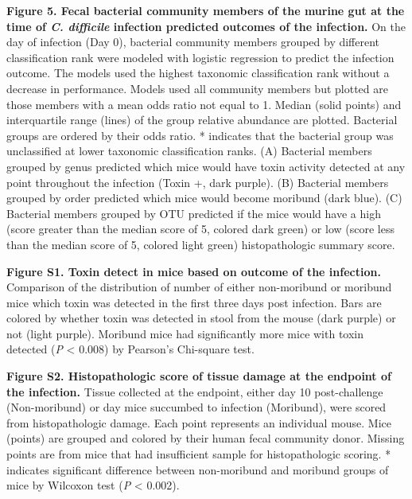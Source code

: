 \documentclass[
  12pt,
]{article}
\begin{document}
\hfill\break

\textbf{Figure 5. Fecal bacterial community members of the murine gut at
the time of \emph{C. difficile} infection predicted outcomes of the
infection.} On the day of infection (Day 0), bacterial community members
grouped by different classification rank were modeled with logistic
regression to predict the infection outcome. The models used the highest
taxonomic classification rank without a decrease in performance. Models
used all community members but plotted are those members with a mean
odds ratio not equal to 1. Median (solid points) and interquartile range
(lines) of the group relative abundance are plotted. Bacterial groups
are ordered by their odds ratio. * indicates that the bacterial group
was unclassified at lower taxonomic classification ranks. (A) Bacterial
members grouped by genus predicted which mice would have toxin activity
detected at any point throughout the infection (Toxin +, dark purple).
(B) Bacterial members grouped by order predicted which mice would become
moribund (dark blue). (C) Bacterial members grouped by OTU predicted if
the mice would have a high (score greater than the median score of 5,
colored dark green) or low (score less than the median score of 5,
colored light green) histopathologic summary score.

\hfill\break

\textbf{Figure S1. Toxin detect in mice based on outcome of the
infection.} Comparison of the distribution of number of either
non-moribund or moribund mice which toxin was detected in the first
three days post infection. Bars are colored by whether toxin was
detected in stool from the mouse (dark purple) or not (light purple).
Moribund mice had significantly more mice with toxin detected (\emph{P}
\textless{} 0.008) by Pearson's Chi-square test.

\hfill\break

\textbf{Figure S2. Histopathologic score of tissue damage at the
endpoint of the infection.} Tissue collected at the endpoint, either day
10 post-challenge (Non-moribund) or day mice succumbed to infection
(Moribund), were scored from histopathologic damage. Each point
represents an individual mouse. Mice (points) are grouped and colored by
their human fecal community donor. Missing points are from mice that had
insufficient sample for histopathologic scoring. * indicates significant
difference between non-moribund and moribund groups of mice by Wilcoxon
test (\emph{P} \textless{} 0.002).

\hfill\break
\end{document}
